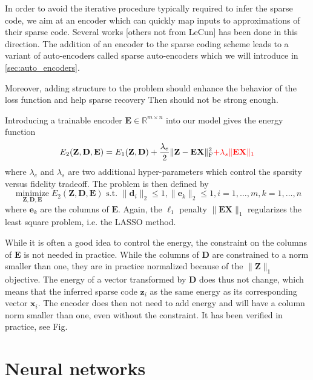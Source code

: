 \documentclass[a4paper,12pt,twoside]{report}
\newcommand{\R}{\mathbb{R}}
\DeclareMathOperator*{\minimizeop}{minimize}
\newcommand{\minimize}[1]{\minimizeop\limits_{#1}}  %
\newcommand{\normO}[1]{\| #1 \|_1}
\newcommand{\normF}[1]{\| #1 \|_\text{F}^2}
\newcommand{\D}{\mathbf{D}}
\newcommand{\E}{\mathbf{E}}
\newcommand{\X}{\mathbf{X}}
\newcommand{\Z}{\mathbf{Z}}
\renewcommand{\d}{\mathbf{d}}
\newcommand{\e}{\mathbf{e}}
\newcommand{\x}{\mathbf{x}}
\newcommand{\z}{\mathbf{z}}
\newcommand{\Eone}{E_1(\Z, \D)}
\newcommand{\Etwo}{E_2(\Z, \D, \E)}
\newcommand{\st}{\text{ s.t. }}
\newcommand{\cst}[2]{\|#1_#2\|_2 \leq 1}
\newcommand{\forallx}[2]{#1 = 1, \ldots, #2}
\begin{document}
In order to avoid the iterative procedure typically required to infer the sparse code, we aim at an encoder which can quickly map inputs to approximations of their sparse code. Several works \cite{lecun2010PSD, lecun2010LISTA, lecun2013DrSAE} {\color{red} [others not from LeCun]} has been done in this direction. The addition of an encoder to the sparse coding scheme leads to a variant of auto-encoders called sparse auto-encoders which we will introduce in \ref{sec:auto_encoders}.

Moreover, adding structure to the problem should enhance the behavior of the loss function and help sparse recovery \cite{kowalski2009sparse, baraniuk2010modelCS, huang2011LearningStructuredSparsity, jenatton2011structured} {\color{red}Then \cite{donoho2003OptSparse} should not be strong enough.}

Introducing a trainable encoder $\E \in \R^{m \times n}$ into our model gives the energy function
\begin{equation}\label{eqn:en_encoder}
	\Etwo = \Eone + \frac{\lambda_e}{2} \normF{\Z - \E \X} {\color{red} + \lambda_s \normO{\E \X}}
\end{equation}
where $\lambda_e$ and $\lambda_s$ are two additional hyper-parameters which control the sparsity versus fidelity tradeoff. The problem is then defined by
\begin{equation}\label{eqn:pr_encoder}
	\minimize{\Z,\D,\E} \Etwo \st \cst{\d}{i} , \cst{\e}{k} ,
	\forallx{i}{m} , \forallx{k}{n}
\end{equation}
where $\e_k$ are the columns of $\E$. Again, the $\ell_1$ penalty $\normO{\E \X}$ regularizes the least square problem, i.e. the \gls{LASSO} method.

While it is often a good idea to control the energy, the constraint on the columns of $\E$ is not needed in practice. While the columns of $\D$ are constrained to a norm smaller than one, they are in practice normalized because of the $\normO{\Z}$ objective. The energy of a vector transformed by $\D$ does thus not change, which means that the inferred sparse code $\z_i$ as the same energy as its corresponding vector $\x_i$. The encoder does then not need to add energy and will have a column norm smaller than one, even without the constraint. It has been verified in practice, see {\color{red} Fig}.

\section{Neural networks}
\end{document}
